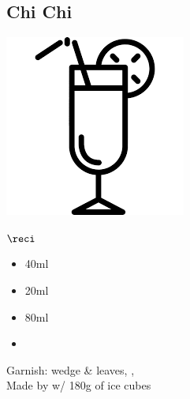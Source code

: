 \subsection{Chi Chi}
\vspace{-7.4mm}
\hspace{30mm}
\includegraphics[scale=.07]{cocktail_glass_tall.png}
\begin{itembox}[l]{\boldmath $\reci$}
\begin{itemize}
\setlength{\parskip}{0cm}
\setlength{\itemsep}{0cm}
\item \vodka 40ml
\item \cococ 20ml
\item \pj 80ml
\item \tw 
\end{itemize}
\vspace{-4mm}
Garnish: \pineapple wedge \& leaves, \cherry, \umbrella\\
Made by \blend w/ 180g of ice cubes
\end{itembox}
